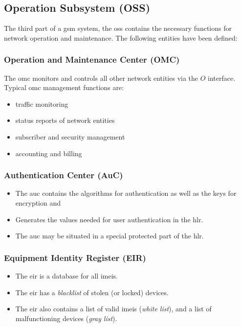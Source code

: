 \subsection[OSS]{Operation Subsystem (OSS)}
The third part of a \gls{gsm} system, the \gls{oss} contains the necessary functions for network operation and maintenance. The following entities have been defined:

\subsubsection[OMC]{Operation and Maintenance Center (OMC)}
 The \gls{omc} monitors and controls all other network entities via the \(O\) interface. Typical \gls{omc} management functions are:
\begin{itemize}
	\item traffic monitoring
	\item status reports of network entities
	\item subscriber and security management
	\item accounting and billing
\end{itemize}

\subsubsection[AuC]{Authentication Center (AuC)}
\begin{itemize}
	\item The \gls{auc} contains the algorithms for authentication as well as the keys for encryption and 
	\item Generates the values needed for user authentication in the \gls{hlr}. 
	\item The \gls{auc} may be situated in a special protected part of the \gls{hlr}.
\end{itemize}

\subsubsection[EIR]{Equipment Identity Register (EIR)}
\begin{itemize}
	\item The \gls{eir} is a database for all \gls{imei}s.
	\item The \gls{eir} has a \textit{blacklist} of stolen (or locked) devices.
	\item The \gls{eir} also contains a list of valid \gls{imei}s (\textit{white list}), and a list of malfunctioning devices (\textit{gray list}).
\end{itemize}
 
